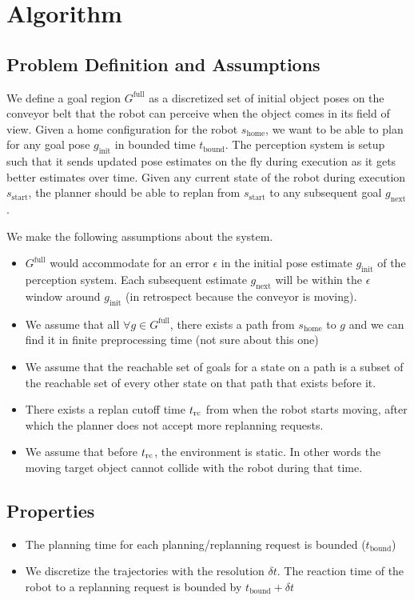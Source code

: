 \section{Algorithm}

\subsection{Problem Definition and Assumptions}
We define a goal region $G^{\textrm{full}}$ as a discretized set of initial object poses on the conveyor belt that the robot can perceive when the object comes in its field of view. Given a home configuration for the robot $s_{\textrm{home}}$, we want to be able to plan for any goal pose $g_{\textrm{init}}$ in bounded time $t_{\textrm{bound}}$. The perception system is setup such that it sends updated pose estimates on the fly during execution as it gets better estimates over time. Given any current state of the robot during execution $s_{\textrm{start}}$, the planner should be able to replan from $s_{\textrm{start}}$ to any subsequent goal $g_{\textrm{next}}$.

We make the following assumptions about the system.
\begin{itemize}
\item $G^{\textrm{full}}$ would accommodate for an error $\epsilon$ in the initial pose estimate $g_{\textrm{init}}$ of the perception system. Each subsequent estimate $g_{\textrm{next}}$ will be within the $\epsilon$ window around $g_{\textrm{init}}$ (in retrospect because the conveyor is moving).
\item We assume that all $\forall g \in G^{\textrm{full}}$, there exists a path from $s_{\textrm{home}}$ to $g$ and we can find it in finite preprocessing time (not sure about this one)
\item We assume that the reachable set of goals for a state on a path is a subset of the reachable set of every other state on that path that exists before it.
\item There exists a replan cutoff time $t_{\textrm{rc}}$ from when the robot starts moving, after which the planner does not accept more replanning requests.
\item We assume that before $t_{\textrm{rc}}$, the environment is static. In other words the moving target object cannot collide with the robot during that time.
\end{itemize}

\subsection{Properties}
\begin{itemize}
\item The planning time for each planning/replanning request is bounded ($t_{\textrm{bound}}$)
\item We discretize the trajectories with the resolution $\delta t$. The reaction time of the robot to a replanning request is bounded by $t_{\textrm{bound}} + \delta t$
\end{itemize}

